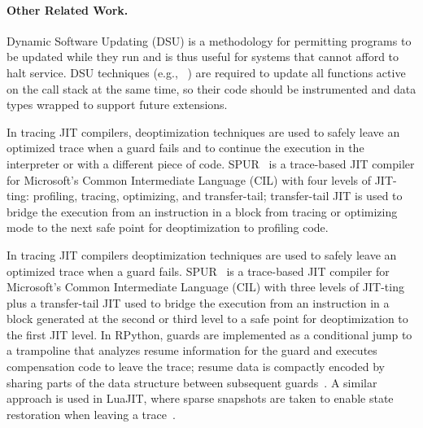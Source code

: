 \paragraph{Other Related Work.}
\ifdefined \fullver
Dynamic Software Updating (DSU) is a methodology for permitting programs to be updated while they run and is thus useful for systems that cannot afford to halt service. DSU techniques (e.g., ~\cite{neamtiu2006dsu,makris2009dsu}) are required to update all functions active on the call stack at the same time, so their code should be instrumented and data types wrapped to support future extensions.

In tracing JIT compilers, deoptimization techniques are used to safely leave an optimized trace when a guard fails and to continue the execution in the interpreter or with a different piece of code. SPUR~\cite{bebenita2010spur} is a trace-based JIT compiler for Microsoft's Common Intermediate Language (CIL) with four levels of JIT-ting: profiling, tracing, optimizing, and transfer-tail; transfer-tail JIT is used to bridge the execution from an instruction in a block from tracing or optimizing mode to the next safe point for deoptimization to profiling code. 
\else

In tracing JIT compilers deoptimization techniques are used to safely leave an optimized trace when a guard fails. SPUR~\cite{bebenita2010spur} is a trace-based JIT compiler for Microsoft's Common Intermediate Language (CIL) with three levels of JIT-ting plus a transfer-tail JIT used to bridge the execution from an instruction in a block generated at the second or third level to a safe point for deoptimization to the first JIT level. 
\fi
In RPython, guards are implemented as a conditional jump to a trampoline that analyzes resume information for the guard and executes compensation code to leave the trace; resume data is compactly encoded by sharing parts of the data structure between subsequent guards~\cite{schneider2012rpython}. A similar approach is used in LuaJIT, where sparse snapshots are taken to enable state restoration when leaving a trace~\cite{luajit}.


